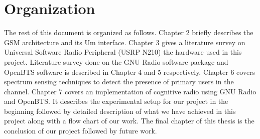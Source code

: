 \section{Organization}
The rest of this document is organized as follows. Chapter 2 briefly describes
the GSM architecture and its Um interface. Chapter 3 gives a literature survey
on Universal Software Radio Peripheral (USRP N210) the hardware used in this 
project. Literature survey done on the GNU Radio software package and OpenBTS 
software is described in Chapter 4 and 5 respectively. Chapter 6 covers 
spectrum sensing techniques to detect the presence of primary users in the 
channel.  Chapter 7 covers an implementation of cognitive radio using GNU Radio
and OpenBTS. It describes the experimental setup for our project in the 
beginning followed by detailed description of what we have achieved in this 
project along with a flow chart of our work. The final chapter of this thesis 
is the conclusion of our project followed by future work. 
